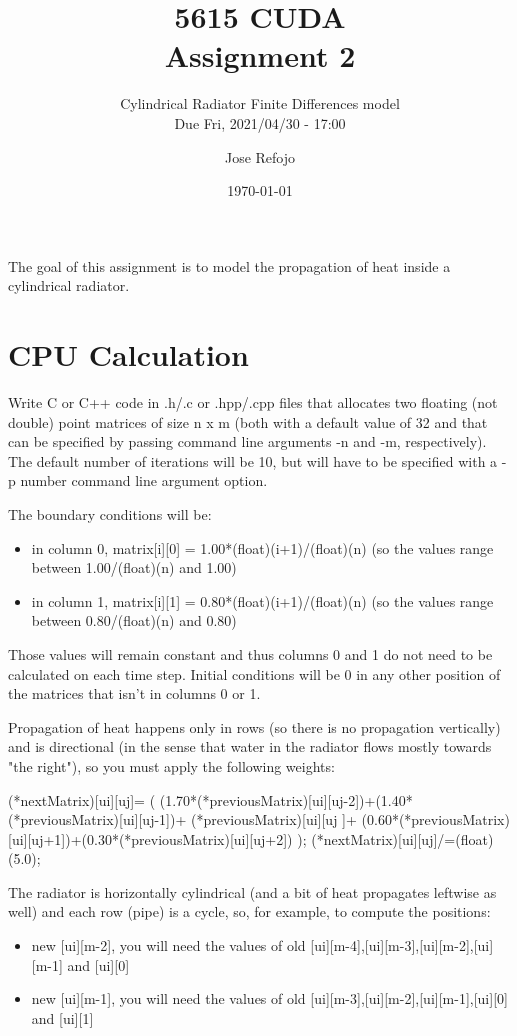 \documentclass[a4paper, fleqn]{article}
\date{\today}
\author{Jose Refojo}
\title{5615 CUDA \\ Assignment 2}
\subtitle{Cylindrical Radiator Finite Differences model\\Due Fri, 2021/04/30 - 17:00}
\begin{document}
\maketitle
The goal of this assignment is to model the propagation of heat inside a cylindrical radiator.

\section{CPU Calculation}%
\label{sec:task_1}

Write C or C++ code in .h/.c or .hpp/.cpp files that allocates two floating (not double) point matrices of size n x m (both with a default value of 32 and that can be specified by passing command line arguments -n and -m, respectively). The default number of iterations will be 10, but will have to be specified with a -p number command line argument option.

The boundary conditions will be:
\begin{itemize}
        \item in column 0, matrix[i][0] = 1.00*(float)(i+1)/(float)(n) (so the values range between 1.00/(float)(n) and 1.00)
        \item in column 1, matrix[i][1] = 0.80*(float)(i+1)/(float)(n) (so the values range between 0.80/(float)(n) and 0.80)
\end{itemize}


Those values will remain constant and thus columns 0 and 1 do not need to be calculated on each time step. Initial conditions will be 0 in any other position of the matrices that isn't in columns 0 or 1.

Propagation of heat happens only in rows (so there is no propagation vertically) and is directional (in the sense that water in the radiator flows mostly towards "the right"), so you must apply the following weights:

(*nextMatrix)[ui][uj]= ( (1.70*(*previousMatrix)[ui][uj-2])+(1.40*(*previousMatrix)[ui][uj-1])+ (*previousMatrix)[ui][uj ]+ (0.60*(*previousMatrix)[ui][uj+1])+(0.30*(*previousMatrix)[ui][uj+2]) ); (*nextMatrix)[ui][uj]/=(float)(5.0);

The radiator is horizontally cylindrical (and a bit of heat propagates leftwise as well) and each row (pipe) is a cycle, so, for example, to compute the positions:

\begin{itemize}
        \item new [ui][m-2], you will need the values of old [ui][m-4],[ui][m-3],[ui][m-2],[ui][m-1] and [ui][0]
        \item new [ui][m-1], you will need the values of old [ui][m-3],[ui][m-2],[ui][m-1],[ui][0] and [ui][1]
\end{itemize}
\end{document}
